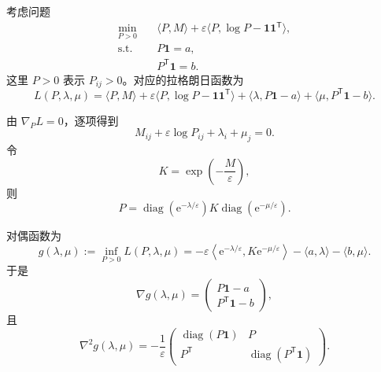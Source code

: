 \documentclass[11pt,a4paper]{ctexart}
\newcommand{\diag}{\operatorname{diag}}
\newcommand{\e}{\mathrm{e}}
\newcommand{\vone}{\bm{1}}
\newcommand{\trans}{\mathsf{T}}
\begin{document}
考虑问题
\begin{equation}\label{eq:primal}
\begin{aligned}
  \min_{P>0}\quad
    &\langle P,M\rangle
      +\varepsilon\langle P,\log P-\vone\vone^{\trans}\rangle,\\
  \text{s.t.}\quad
    &P\vone=a,\\
    &P^{\trans}\vone=b.
\end{aligned}
\end{equation}
这里 $P>0$ 表示 $P_{ij}>0$。对应的拉格朗日函数为
\begin{equation}
  L(P,\lambda,\mu)
  =\langle P,M\rangle
  +\varepsilon\langle P,\log P-\vone\vone^{\trans}\rangle
  +\langle\lambda,P\vone-a\rangle
  +\langle\mu,P^{\trans}\vone-b\rangle.
\end{equation}

由 $\nabla_P L=0$，逐项得到
\[
  M_{ij}+\varepsilon\log P_{ij}+\lambda_i+\mu_j=0.
\]
令
\begin{equation}
  K=\exp\!\left(-\frac{M}{\varepsilon}\right),
\end{equation}
则
\begin{equation}\label{eq:P-lambda-mu}
  P
  =\diag\!\left(\e^{-\lambda/\varepsilon}\right)
   K
   \diag\!\left(\e^{-\mu/\varepsilon}\right).
\end{equation}

对偶函数为
\begin{equation}\label{eq:dual}
  g(\lambda,\mu)
  :=\inf_{P>0}L(P,\lambda,\mu)
  =-\varepsilon
  \left\langle\e^{-\lambda/\varepsilon},
  K\e^{-\mu/\varepsilon}\right\rangle
  -\langle a,\lambda\rangle-\langle b,\mu\rangle.
\end{equation}
于是
\begin{equation}\label{eq:dual-gradient}
  \nabla g(\lambda,\mu)
  =
  \begin{pmatrix}
    P\vone-a\\[0.2em]
    P^{\trans}\vone-b
  \end{pmatrix},
\end{equation}
且
\begin{equation}\label{eq:dual-hessian}
  \nabla^2g(\lambda,\mu)
  =-\frac{1}{\varepsilon}
  \begin{pmatrix}
    \diag(P\vone) & P\\
    P^{\trans} & \diag(P^{\trans}\vone)
  \end{pmatrix}.
\end{equation}
\end{document}
